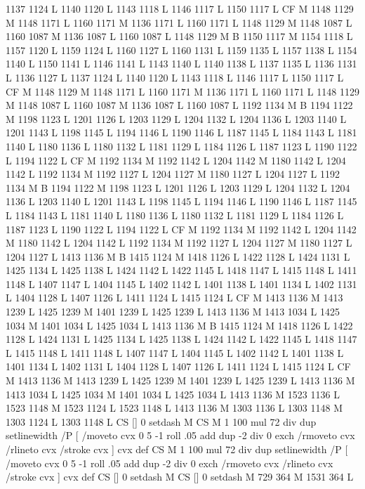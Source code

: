 {{{{{{{{{{{{{{{{{{1137 1124 L
1140 1120 L
1143 1118 L
1146 1117 L
1150 1117 L
CF M
1148 1129 M 1148 1171 L
1160 1171 M 1136 1171 L
1160 1171 L
1148 1129 M 1148 1087 L
1160 1087 M 1136 1087 L
1160 1087 L
1148 1129 M B
1150 1117 M 1154 1118 L
1157 1120 L
1159 1124 L
1160 1127 L
1160 1131 L
1159 1135 L
1157 1138 L
1154 1140 L
1150 1141 L
1146 1141 L
1143 1140 L
1140 1138 L
1137 1135 L
1136 1131 L
1136 1127 L
1137 1124 L
1140 1120 L
1143 1118 L
1146 1117 L
1150 1117 L
CF M
1148 1129 M 1148 1171 L
1160 1171 M 1136 1171 L
1160 1171 L
1148 1129 M 1148 1087 L
1160 1087 M 1136 1087 L
1160 1087 L
1192 1134 M B
1194 1122 M 1198 1123 L
1201 1126 L
1203 1129 L
1204 1132 L
1204 1136 L
1203 1140 L
1201 1143 L
1198 1145 L
1194 1146 L
1190 1146 L
1187 1145 L
1184 1143 L
1181 1140 L
1180 1136 L
1180 1132 L
1181 1129 L
1184 1126 L
1187 1123 L
1190 1122 L
1194 1122 L
CF M
1192 1134 M 1192 1142 L
1204 1142 M 1180 1142 L
1204 1142 L
1192 1134 M 1192 1127 L
1204 1127 M 1180 1127 L
1204 1127 L
1192 1134 M B
1194 1122 M 1198 1123 L
1201 1126 L
1203 1129 L
1204 1132 L
1204 1136 L
1203 1140 L
1201 1143 L
1198 1145 L
1194 1146 L
1190 1146 L
1187 1145 L
1184 1143 L
1181 1140 L
1180 1136 L
1180 1132 L
1181 1129 L
1184 1126 L
1187 1123 L
1190 1122 L
1194 1122 L
CF M
1192 1134 M 1192 1142 L
1204 1142 M 1180 1142 L
1204 1142 L
1192 1134 M 1192 1127 L
1204 1127 M 1180 1127 L
1204 1127 L
1413 1136 M B
1415 1124 M 1418 1126 L
1422 1128 L
1424 1131 L
1425 1134 L
1425 1138 L
1424 1142 L
1422 1145 L
1418 1147 L
1415 1148 L
1411 1148 L
1407 1147 L
1404 1145 L
1402 1142 L
1401 1138 L
1401 1134 L
1402 1131 L
1404 1128 L
1407 1126 L
1411 1124 L
1415 1124 L
CF M
1413 1136 M 1413 1239 L
1425 1239 M 1401 1239 L
1425 1239 L
1413 1136 M 1413 1034 L
1425 1034 M 1401 1034 L
1425 1034 L
1413 1136 M B
1415 1124 M 1418 1126 L
1422 1128 L
1424 1131 L
1425 1134 L
1425 1138 L
1424 1142 L
1422 1145 L
1418 1147 L
1415 1148 L
1411 1148 L
1407 1147 L
1404 1145 L
1402 1142 L
1401 1138 L
1401 1134 L
1402 1131 L
1404 1128 L
1407 1126 L
1411 1124 L
1415 1124 L
CF M
1413 1136 M 1413 1239 L
1425 1239 M 1401 1239 L
1425 1239 L
1413 1136 M 1413 1034 L
1425 1034 M 1401 1034 L
1425 1034 L
1413 1136 M 1523 1136 L
1523 1148 M 1523 1124 L
1523 1148 L
1413 1136 M 1303 1136 L
1303 1148 M 1303 1124 L
1303 1148 L
CS [] 0 setdash M
CS M 1 100 mul 72 div dup setlinewidth
/P [ /moveto cvx 0 5 -1 roll .05 add dup -2 div 0 exch /rmoveto cvx /rlineto cvx /stroke cvx ] cvx def
CS M 1 100 mul 72 div dup setlinewidth
/P [ /moveto cvx 0 5 -1 roll .05 add dup -2 div 0 exch /rmoveto cvx /rlineto cvx /stroke cvx ] cvx def
CS [] 0 setdash M
CS [] 0 setdash M
729 364 M 1531 364 L
}}}}}}}}}}}}}}}}}}
